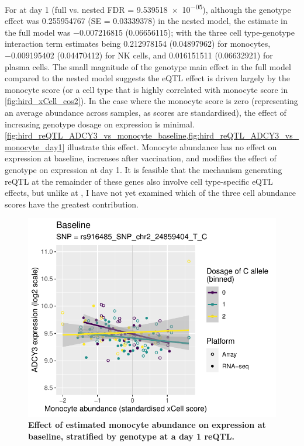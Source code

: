 For  at day 1 (full vs. nested \gls{FDR} = \num{9.539518e-05}),
although the genotype effect was \num{0.255954767} (SE = \num{0.03339378}) in the nested model,
the estimate in the full model was \num{-0.007216815} (\num{0.06656115});
with the three cell type-genotype interaction term estimates being
\num{0.212978154} (\num{0.04897962}) for monocytes,
\num{-0.009195402} (\num{0.04470412}) for \gls{NK} cells,
and \num{0.016151511} (\num{0.06632921}) for plasma cells.
The small magnitude of the genotype main effect in the full model compared to the nested model suggests the \gls{eQTL} effect is driven largely by the monocyte score (or a cell type that is highly correlated with monocyte score in \cref{fig:hird_xCell_cos2}).
In the case where the monocyte score is zero (representing an average abundance across samples, as scores are standardised), the effect of increasing genotype dosage on  expression is minimal.
\cref{fig:hird_reQTL_ADCY3_vs_monocyte_baseline,fig:hird_reQTL_ADCY3_vs_monocyte_day1} illustrate this effect.
Monocyte abundance has no effect on expression at baseline, 
increases after vaccination, and modifies the effect of genotype on expression at day 1.
It is feasible that the mechanism generating \gls{reQTL} at the remainder of these genes also involve cell type-specific \gls{eQTL} effects, 
but unlike at , 
I have not yet examined which of the three cell abundance scores have the greatest contribution.

\begin{figure}
    \centering
    \includegraphics[width=1.0\textwidth,page=1]{mainmatter/figures/chapter_03/lme4qtl.ENSG00000138031_Monocyte_baseline.pdf}
    \caption{
        \textbf{Effect of estimated monocyte abundance on  expression at baseline, stratified by genotype at a day 1  \gls{reQTL}.}
    }
    \label{fig:hird_reQTL_ADCY3_vs_monocyte_baseline}
\end{figure}

